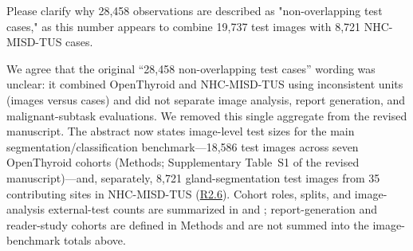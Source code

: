 \label{rev:R2.3}
\begin{reviewercomment}
Please clarify why 28,458 observations are described as "non-overlapping test cases," as this number appears to combine 19,737 test images with 8,721 NHC-MISD-TUS cases.
\end{reviewercomment}
\begin{authorresponse}
We agree that the original ``28,458 non-overlapping test cases'' wording was unclear: it combined OpenThyroid and NHC-MISD-TUS using inconsistent units (images versus cases) and did not separate image analysis, report generation, and malignant-subtask evaluations. We removed this single aggregate from the revised manuscript. The abstract now states image-level test sizes for the main segmentation/classification benchmark---18,586 test images across seven OpenThyroid cohorts (Methods; Supplementary Table~S1 of the revised manuscript)---and, separately, 8,721 gland-segmentation test images from 35 contributing sites in NHC-MISD-TUS (\hyperref[rev:R2.6]{R2.6}). Cohort roles, splits, and image-analysis external-test counts are summarized in  and ; report-generation and reader-study cohorts are defined in Methods and are not summed into the image-benchmark totals above.\par
\par
\end{authorresponse}

